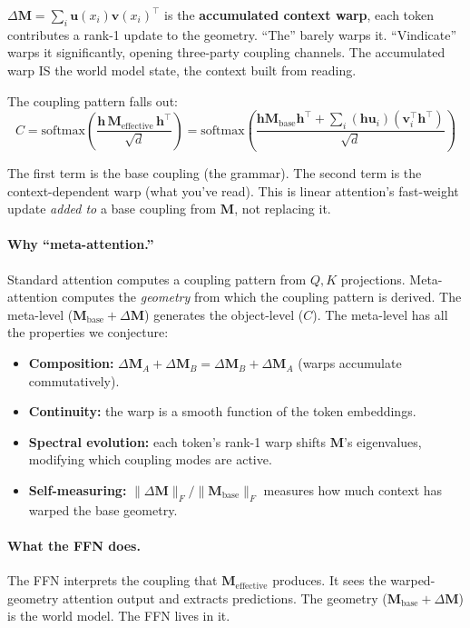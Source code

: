 \documentclass[11pt, a4paper]{article}
\newcommand{\M}{\mathbf{M}}
\newcommand{\h}{\mathbf{h}}
\theoremstyle{plain}
\theoremstyle{definition}
\theoremstyle{remark}
\begin{document}
$\Delta\M = \sum_{i} \mathbf{u}(x_i) \mathbf{v}(x_i)^\top$ is the \textbf{accumulated context warp}, each token contributes a rank-1 update to the geometry.
``The'' barely warps it.
``Vindicate'' warps it significantly, opening three-party coupling channels.
The accumulated warp IS the world model state, the context built from reading.

The coupling pattern falls out:
\begin{equation}
C = \mathrm{softmax}\!\left(\frac{\h \, \M_{\mathrm{effective}} \, \h^\top}{\sqrt{d}}\right)
  = \mathrm{softmax}\!\left(\frac{\h \M_{\mathrm{base}} \h^\top + \sum_i (\h \mathbf{u}_i)(\mathbf{v}_i^\top \h^\top)}{\sqrt{d}}\right)
\end{equation}

The first term is the base coupling (the grammar).
The second term is the context-dependent warp (what you've read).
This is linear attention's fast-weight update \emph{added to} a base coupling from $\M$, not replacing it.

\paragraph{Why ``meta-attention.''}
Standard attention computes a coupling pattern from $Q, K$ projections.
Meta-attention computes the \emph{geometry} from which the coupling pattern is derived.
The meta-level ($\M_{\mathrm{base}} + \Delta\M$) generates the object-level ($C$).
The meta-level has all the properties we conjecture:
\begin{itemize}[nosep]
\item \textbf{Composition:} $\Delta\M_A + \Delta\M_B = \Delta\M_B + \Delta\M_A$ (warps accumulate commutatively).
\item \textbf{Continuity:} the warp is a smooth function of the token embeddings.
\item \textbf{Spectral evolution:} each token's rank-1 warp shifts $\M$'s eigenvalues, modifying which coupling modes are active.
\item \textbf{Self-measuring:} $\|\Delta\M\|_F / \|\M_{\mathrm{base}}\|_F$ measures how much context has warped the base geometry.
\end{itemize}

\paragraph{What the FFN does.}
The FFN interprets the coupling that $\M_{\mathrm{effective}}$ produces.
It sees the warped-geometry attention output and extracts predictions.
The geometry ($\M_{\mathrm{base}} + \Delta\M$) is the world model.
The FFN lives in it.
\end{document}
